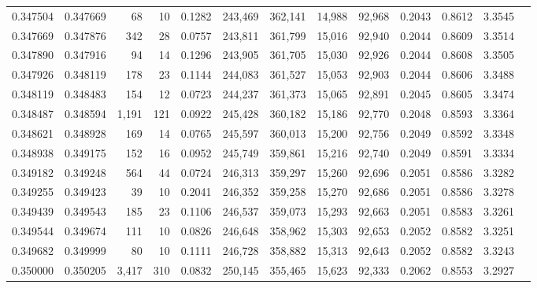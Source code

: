 \begin{tabular}{rrrrrrrrrrrrr}
0.347504 & 0.347669 &    68 &  10 &                                     0.1282 & 243,469 & 362,141 &  14,988 &  92,968 & 0.2043 & 0.8612 & 3.3545 \\
0.347669 & 0.347876 &   342 &  28 &                                     0.0757 & 243,811 & 361,799 &  15,016 &  92,940 & 0.2044 & 0.8609 & 3.3514 \\
0.347890 & 0.347916 &    94 &  14 &                                     0.1296 & 243,905 & 361,705 &  15,030 &  92,926 & 0.2044 & 0.8608 & 3.3505 \\
0.347926 & 0.348119 &   178 &  23 &                                     0.1144 & 244,083 & 361,527 &  15,053 &  92,903 & 0.2044 & 0.8606 & 3.3488 \\
0.348119 & 0.348483 &   154 &  12 &                                     0.0723 & 244,237 & 361,373 &  15,065 &  92,891 & 0.2045 & 0.8605 & 3.3474 \\
0.348487 & 0.348594 & 1,191 & 121 &                                     0.0922 & 245,428 & 360,182 &  15,186 &  92,770 & 0.2048 & 0.8593 & 3.3364 \\
0.348621 & 0.348928 &   169 &  14 &                                     0.0765 & 245,597 & 360,013 &  15,200 &  92,756 & 0.2049 & 0.8592 & 3.3348 \\
0.348938 & 0.349175 &   152 &  16 &                                     0.0952 & 245,749 & 359,861 &  15,216 &  92,740 & 0.2049 & 0.8591 & 3.3334 \\
0.349182 & 0.349248 &   564 &  44 &                                     0.0724 & 246,313 & 359,297 &  15,260 &  92,696 & 0.2051 & 0.8586 & 3.3282 \\
0.349255 & 0.349423 &    39 &  10 &                                     0.2041 & 246,352 & 359,258 &  15,270 &  92,686 & 0.2051 & 0.8586 & 3.3278 \\
0.349439 & 0.349543 &   185 &  23 &                                     0.1106 & 246,537 & 359,073 &  15,293 &  92,663 & 0.2051 & 0.8583 & 3.3261 \\
0.349544 & 0.349674 &   111 &  10 &                                     0.0826 & 246,648 & 358,962 &  15,303 &  92,653 & 0.2052 & 0.8582 & 3.3251 \\
0.349682 & 0.349999 &    80 &  10 &                                     0.1111 & 246,728 & 358,882 &  15,313 &  92,643 & 0.2052 & 0.8582 & 3.3243 \\
0.350000 & 0.350205 & 3,417 & 310 &                                     0.0832 & 250,145 & 355,465 &  15,623 &  92,333 & 0.2062 & 0.8553 & 3.2927 \\

\end{tabular}
